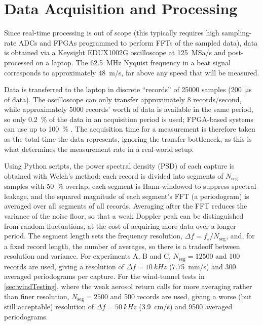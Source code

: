  \section{Data Acquisition and Processing}
 \label{sec:design-DataAcquisition}
 Since real-time processing is out of scope (this typically requires high sampling-rate ADCs and FPGAs programmed to perform FFTs of the sampled data), data is obtained via a Keysight EDUX1002G oscilloscope at \SI{125}{MSa/s} and post-processed on a laptop. The \SI{62.5}{MHz} Nyquist frequency in a beat signal corresponds to approximately \SI{48}{m/s}, far above any speed that will be measured.
 
 Data is transferred to the laptop in discrete ``records'' of \num{25000} samples (\SI{200}{\micro\second} of data). The oscilloscope can only transfer approximately 8 records/second, while approximately 5000 records' worth of data is available in the same period, so only \SI{0.2}{\percent} of the data in an acquisition period is used; FPGA-based systems can use up to \SI{100}{\percent} \cite{hill_remote_nodate}. The acquisition time for a measurement is therefore taken as the total time the data represents, ignoring the transfer bottleneck, as this is what determines the measurement rate in a real-world setup.
 
 Using Python scripts, the power spectral density (PSD) of each capture is obtained with Welch's method: each record is divided into segments of $N_{\mathrm{seg}}$ samples with \SI{50}{\percent} overlap, each segment is Hann-windowed to suppress spectral leakage, and the squared magnitude of each segment's FFT (a periodogram) is averaged over all segments of all records. Averaging after the FFT reduces the variance of the noise floor, so that a weak Doppler peak can be distinguished from random fluctuations, at the cost of acquiring more data over a longer period. The segment length sets the frequency resolution, $\Delta f = f_s/N_{\mathrm{seg}}$, and, for a fixed record length, the number of averages, so there is a tradeoff between resolution and variance. For experiments A, B and C, $N_{\mathrm{seg}} = \num{12500}$ and 100 records are used, giving a resolution of $\Delta f = \SI{10}{kHz}$ (\SI{7.75}{mm/s}) and 300 averaged periodograms per capture. For the wind-tunnel tests in \autoref{sec:windTesting}, where the weak aerosol return calls for more averaging rather than finer resolution, $N_{\mathrm{seg}} = \num{2500}$ and 500 records are used, giving a worse (but still acceptable) resolution of $\Delta f = \SI{50}{kHz}$ (\SI{3.9}{cm/s}) and \num{9500} averaged periodograms.
 
